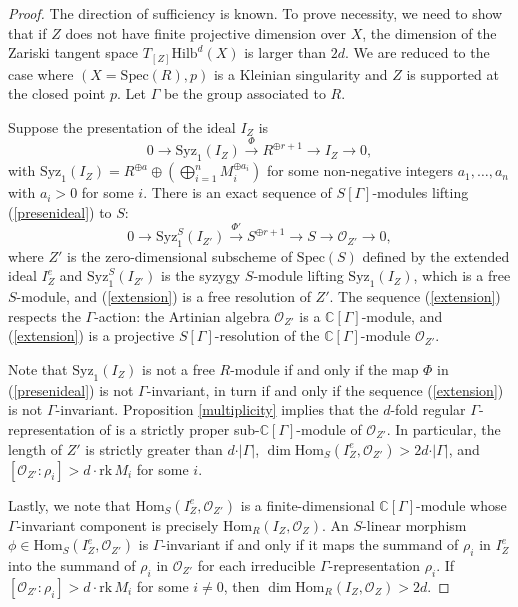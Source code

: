 \documentclass{amsart}[12pt]
\theoremstyle{definition}
\theoremstyle{remark}
\numberwithin{equation}{section}
\begin{document}
\begin{proof}
The direction of sufficiency is known. To prove necessity, we need to show that if $Z$ does not have finite projective dimension over $X$, the dimension of the Zariski tangent space $T_{[Z]}\mathrm{Hilb}^d(X)$ is larger than $2d$. We are reduced to the case where $(X = \mathrm{Spec}(R), p)$ is a Kleinian singularity and $Z$ is supported at the closed point $p$. Let $\Gamma$ be the group associated to $R$. 

Suppose the presentation of the ideal $I_Z$ is
\begin{equation}\label{presenideal}
0 \to \mathrm{Syz}_1(I_Z) \xrightarrow{\Phi} R^{\oplus r + 1} \to I_Z \to 0,
\end{equation}
with $\mathrm{Syz}_1(I_Z) = R^{\oplus a} \oplus \left(\bigoplus_{i = 1}^nM_i^{\oplus a_i}\right)$ for some non-negative integers $a_1, \dots, a_n$ with $a_i > 0$ for some $i$. There is an exact sequence of $S[\Gamma]$-modules lifting (\ref{presenideal}) to $S$:
\begin{equation}\label{extension}
0 \to \mathrm{Syz}_{1}^S(I_{Z'}) \xrightarrow{\Phi'} S^{\oplus r + 1} \to S \to \mathcal{O}_{Z'} \to 0,
\end{equation}
where $Z'$ is the zero-dimensional subscheme of $\mathrm{Spec}(S)$ defined by the extended ideal $I_Z^e$ and $\mathrm{Syz}_{1}^S(I_{Z'})$ is the syzygy $S$-module lifting $\mathrm{Syz}_1(I_Z)$, which is a free $S$-module, and (\ref{extension}) is a free resolution of $Z'$. The sequence (\ref{extension}) respects the $\Gamma$-action: the Artinian algebra $\mathcal{O}_{Z'}$ is a $\mathbb{C}[\Gamma]$-module, and (\ref{extension}) is a projective $S[\Gamma]$-resolution of the $\mathbb{C}[\Gamma]$-module $\mathcal{O}_{Z'}$. 

Note that $\mathrm{Syz}_1(I_Z)$ is not a free $R$-module if and only if the map $\Phi$ in (\ref{presenideal}) is not $\Gamma$-invariant, in turn if and only if the sequence (\ref{extension}) is not $\Gamma$-invariant. Proposition \ref{multiplicity} implies that the $d$-fold regular $\Gamma$-representation of is a strictly proper sub-$\mathbb{C}[\Gamma]$-module of $\mathcal{O}_{Z'}$. In particular, the length of $Z'$ is strictly greater than $d \cdot \vert \Gamma \vert$, $\dim \mathrm{Hom}_S(I_{Z}^e, \mathcal{O}_{Z'}) > 2d \cdot \vert \Gamma \vert$, and $[\mathcal{O}_{Z'}: \rho_i] > d \cdot \mathrm{rk}\,M_i$ for some $i$. 

Lastly, we note that $\mathrm{Hom}_S(I_{Z}^e, \mathcal{O}_{Z'})$ is a finite-dimensional $\mathbb{C}[\Gamma]$-module whose $\Gamma$-invariant component is precisely $\mathrm{Hom}_R(I_{Z}, \mathcal{O}_{Z})$. An $S$-linear morphism $\phi \in \mathrm{Hom}_S(I_{Z}^e, \mathcal{O}_{Z'})$ is $\Gamma$-invariant if and only if it maps the summand of $\rho_i$ in $I_{Z}^e$ into the summand of $\rho_i$ in $\mathcal{O}_{Z'}$ for each irreducible $\Gamma$-representation $\rho_i$. If $[\mathcal{O}_{Z'}: \rho_i] > d \cdot \mathrm{rk} \,M_i$ for some $i \neq 0$, then $\dim \mathrm{Hom}_R(I_{Z}, \mathcal{O}_{Z}) > 2d$. 
\end{proof}
\end{document}
